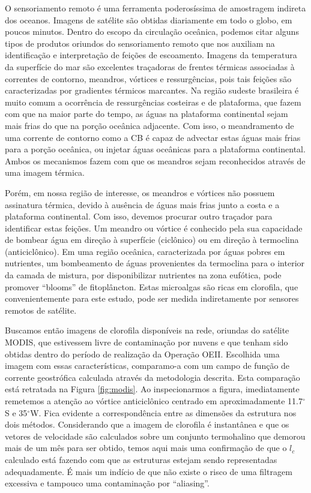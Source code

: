 \documentclass[12pt,portuguese,a4paper,pdftex]{article}
\begin{document}
O sensoriamento remoto é uma ferramenta poderosíssima de amostragem indireta dos oceanos. Imagens de satélite
são obtidas diariamente em todo o globo, em poucos minutos. Dentro do escopo da circulação oceânica, podemos
citar alguns tipos de produtos oriundos do sensoriamento remoto que nos auxiliam na identificação e interpretação
de feições de escoamento. Imagens da temperatura da superfície do mar são excelentes traçadoras de frentes térmicas
associadas à correntes de contorno, meandros, vórtices e ressurgências, pois tais feições são caracterizadas por
gradientes térmicos marcantes. Na região sudeste brasileira é muito comum a ocorrência de ressurgências costeiras  e
de plataforma, que fazem com que na maior parte do tempo, as águas na plataforma continental sejam mais frias do que 
na porção oceânica adjacente. Com isso, o meandramento de uma corrente de contorno como a CB é capaz de advectar estas
águas mais frias para a porção oceânica, ou injetar águas oceânicas para a plataforma continental. Ambos os mecanismos
fazem com que os meandros sejam reconhecidos através de uma imagem térmica. 
  
Porém, em nossa região de interesse, os meandros e vórtices não possuem assinatura
térmica, devido à ausência de águas mais frias junto a costa e a plataforma continental. Com isso, devemos procurar
outro traçador para identificar estas feições. Um meandro ou vórtice é conhecido pela sua capacidade de 
bombear água em direção à superfície (ciclônico) ou em direção à termoclina (anticiclônico). Em uma região oceânica, 
caracterizada por águas pobres em nutrientes, um bombeamento de águas provenientes da termoclina para o interior
da camada de mistura, por disponibilizar nutrientes na zona eufótica, pode promover ``blooms'' de fitoplâncton.
Estas microalgas são ricas em clorofila, que convenientemente para este estudo, pode ser medida indiretamente
por sensores remotos de satélite. 

Buscamos então imagens de clorofila disponíveis na rede, oriundas do satélite MODIS, que estivessem livre
de contaminação por nuvens e que tenham sido obtidas dentro do período de realização da Operação OEII. Escolhida uma
imagem com essas características, comparamo-a com um campo de função de corrente geostrófica calculada através
da metodologia descrita. Esta comparação está retratada na Figura \ref{fig:modis}. Ao inspecionarmos a figura, 
imediatamente remetemos a atenção ao vórtice anticiclônico centrado em aproximadamente 11.7$^\circ$S e 35$^\circ$W.
Fica evidente a correspondência entre as dimensões da estrutura nos dois métodos. Considerando que a imagem de 
clorofila é instantânea e que os vetores de velocidade são calculados sobre um conjunto termohalino que demorou
mais de um mês para ser obtido, temos aqui mais uma confirmação de que o $l_c$ calculado está fazendo com que as 
estruturas estejam sendo representadas adequadamente. É mais um indício de que não existe o risco de uma 
filtragem excessiva e tampouco uma contaminação por ``aliasing''.  
\end{document}
